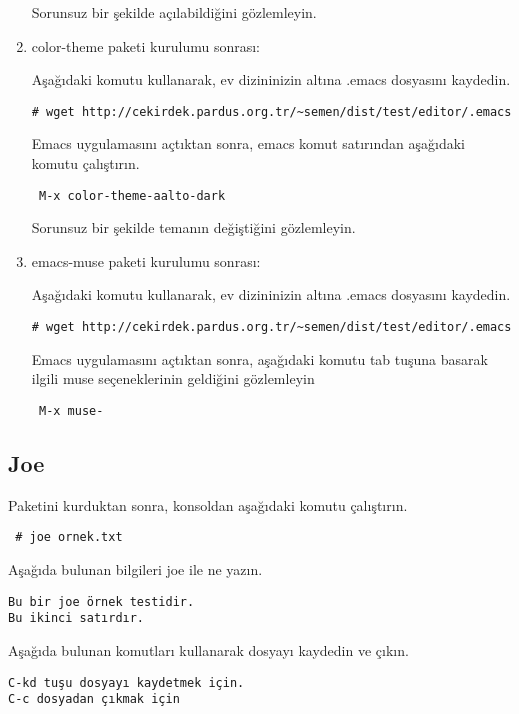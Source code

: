 \documentclass[a4paper,10pt]{article}
\begin{document}
\begin{enumerate}
Sorunsuz bir şekilde açılabildiğini gözlemleyin.

\item color-theme paketi kurulumu sonrası:


Aşağıdaki komutu kullanarak, ev dizininizin altına .emacs dosyasını kaydedin.
\begin{verbatim}
# wget http://cekirdek.pardus.org.tr/~semen/dist/test/editor/.emacs 
\end{verbatim}

Emacs uygulamasını açtıktan sonra, emacs komut satırından aşağıdaki komutu çalıştırın.
\begin{verbatim}
 M-x color-theme-aalto-dark
\end{verbatim}

Sorunsuz bir şekilde temanın değiştiğini gözlemleyin.

\item emacs-muse paketi kurulumu sonrası:

Aşağıdaki komutu kullanarak, ev dizininizin altına .emacs dosyasını kaydedin.
\begin{verbatim}
# wget http://cekirdek.pardus.org.tr/~semen/dist/test/editor/.emacs 
\end{verbatim}

Emacs uygulamasını açtıktan sonra, aşağıdaki komutu tab tuşuna basarak ilgili muse seçeneklerinin geldiğini gözlemleyin
\begin{verbatim}
 M-x muse-
\end{verbatim}


\end{enumerate}


\subsection*{Joe}

Paketini kurduktan sonra, konsoldan aşağıdaki komutu çalıştırın.

\begin{verbatim}
 # joe ornek.txt
\end{verbatim}

Aşağıda bulunan bilgileri joe ile ne yazın.
\begin{verbatim}
Bu bir joe örnek testidir.
Bu ikinci satırdır.
\end{verbatim}

Aşağıda bulunan komutları kullanarak dosyayı kaydedin ve çıkın.
\begin{verbatim}
C-kd tuşu dosyayı kaydetmek için.
C-c dosyadan çıkmak için
\end{verbatim}
\end{document}
